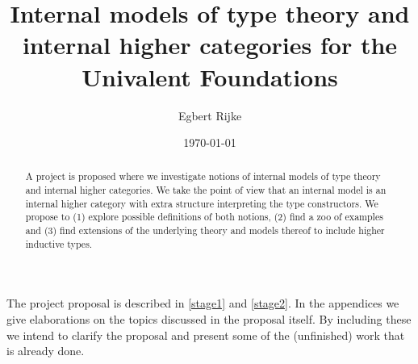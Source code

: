 \documentclass{article}
\title{Internal models of type theory and internal higher categories for the
Univalent Foundations}
\author{Egbert Rijke}
\date{\today}
\begin{document}
\maketitle

\begin{abstract}
A project is proposed where we investigate notions of internal models of type
theory and internal higher categories. We take the point of view that an
internal model is an internal higher category with extra structure interpreting
the type constructors. We propose to (1) explore possible definitions of both
notions, (2) find a zoo of examples and (3) find extensions of the underlying
theory and models thereof to include higher inductive types.
\end{abstract}

\tableofcontents

\vspace{2\baselineskip}
The project proposal is described in \autoref{stage1} and \autoref{stage2}. In
the appendices we give elaborations on the topics discussed in the proposal itself.
By including these we intend to clarify the proposal and present some of the 
(unfinished) work that is already done.








%

\newpage
\appendix


%

%

%
\end{document}
